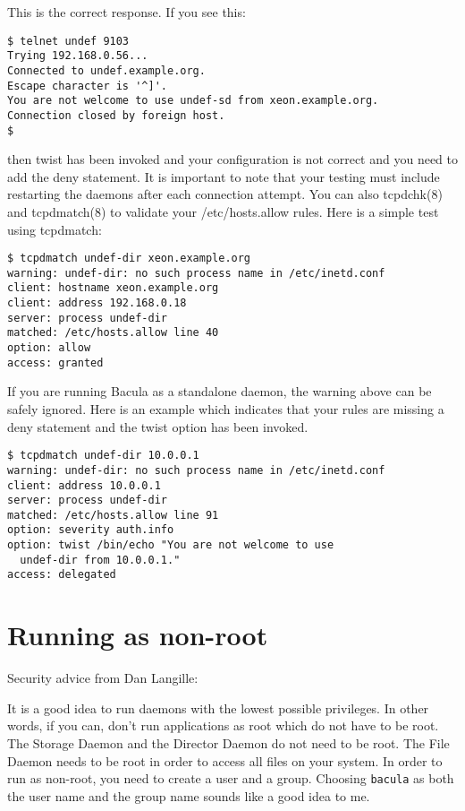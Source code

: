 This is the correct response. If you see this: 

\footnotesize
\begin{verbatim}
$ telnet undef 9103
Trying 192.168.0.56...
Connected to undef.example.org.
Escape character is '^]'.
You are not welcome to use undef-sd from xeon.example.org.
Connection closed by foreign host.
$
\end{verbatim}
\normalsize

then twist has been invoked and your configuration is not correct and you need
to add the deny statement. It is important to note that your testing must
include restarting the daemons after each connection attempt. You can also
tcpdchk(8) and tcpdmatch(8) to validate your /etc/hosts.allow rules. Here is a
simple test using tcpdmatch: 

\footnotesize
\begin{verbatim}
$ tcpdmatch undef-dir xeon.example.org
warning: undef-dir: no such process name in /etc/inetd.conf
client: hostname xeon.example.org
client: address 192.168.0.18
server: process undef-dir
matched: /etc/hosts.allow line 40
option: allow
access: granted
\end{verbatim}
\normalsize

If you are running Bacula as a standalone daemon, the warning above can be
safely ignored. Here is an example which indicates that your rules are missing
a deny statement and the twist option has been invoked. 

\footnotesize
\begin{verbatim}
$ tcpdmatch undef-dir 10.0.0.1
warning: undef-dir: no such process name in /etc/inetd.conf
client: address 10.0.0.1
server: process undef-dir
matched: /etc/hosts.allow line 91
option: severity auth.info
option: twist /bin/echo "You are not welcome to use
  undef-dir from 10.0.0.1."
access: delegated
\end{verbatim}
\normalsize

\section{Running as non-root}

Security advice from Dan Langille: 



It is a good idea to run daemons with the lowest possible privileges.  In
other words, if you can, don't run applications as root which do  not have to
be root.  The Storage Daemon and the Director Daemon do not need to be root.
The  File Daemon needs to be root in order to access all files on your system.
In order to run as non-root, you need to create a user and a group.  Choosing
{\tt bacula} as both the user name and the group name sounds like a good idea
to me.  

